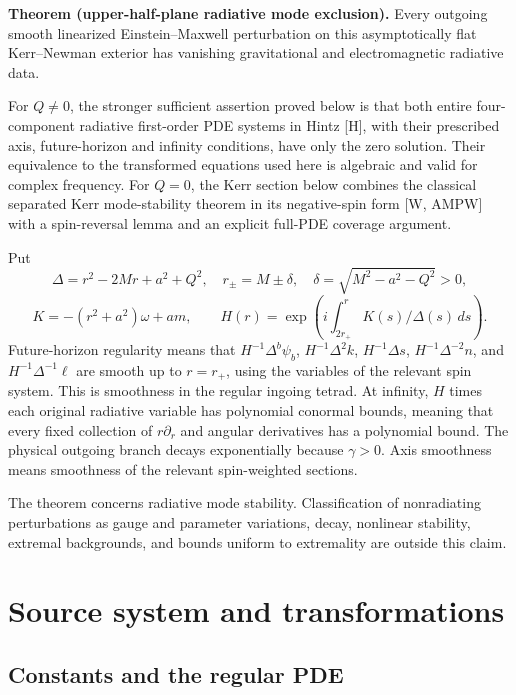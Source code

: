 \documentclass[11pt,a4paper]{article}
\begin{document}
\textbf{Theorem (upper-half-plane radiative mode exclusion).} Every
outgoing smooth linearized Einstein--Maxwell perturbation on this
asymptotically flat Kerr--Newman exterior has vanishing gravitational
and electromagnetic radiative data.

For \(Q\ne0\), the stronger sufficient assertion proved below is that
both entire four-component radiative first-order PDE systems in Hintz
{[}H{]}, with their prescribed axis, future-horizon and infinity
conditions, have only the zero solution. Their equivalence to the
transformed equations used here is algebraic and valid for complex
frequency. For \(Q=0\), the Kerr section below combines the classical
separated Kerr mode-stability theorem in its negative-spin form {[}W,
AMPW{]} with a spin-reversal lemma and an explicit full-PDE coverage
argument.

Put \[
 \Delta=r^2-2Mr+a^2+Q^2,\quad r_\pm=M\pm\delta,\quad
 \delta=\sqrt{M^2-a^2-Q^2}>0,
\] \[
 K=-(r^2+a^2)\omega+am,\qquad
 H(r)=\exp\left(i\int_{2r_+}^r K(s)/\Delta(s)\,ds\right).
\] Future-horizon regularity means that \(H^{-1}\Delta^b\psi_b\),
\(H^{-1}\Delta^2k\), \(H^{-1}\Delta s\), \(H^{-1}\Delta^{-2}n\), and
\(H^{-1}\Delta^{-1}\ell\) are smooth up to \(r=r_+\), using the
variables of the relevant spin system. This is smoothness in the regular
ingoing tetrad. At infinity, \(H\) times each original radiative
variable has polynomial conormal bounds, meaning that every fixed
collection of \(r\partial_r\) and angular derivatives has a polynomial
bound. The physical outgoing branch decays exponentially because
\(\gamma>0\). Axis smoothness means smoothness of the relevant
spin-weighted sections.

The theorem concerns radiative mode stability. Classification of
nonradiating perturbations as gauge and parameter variations, decay,
nonlinear stability, extremal backgrounds, and bounds uniform to
extremality are outside this claim.

\section{Source system and
transformations}\label{source-system-and-transformations}

\subsection{Constants and the regular
PDE}\label{constants-and-the-regular-pde}
\end{document}
